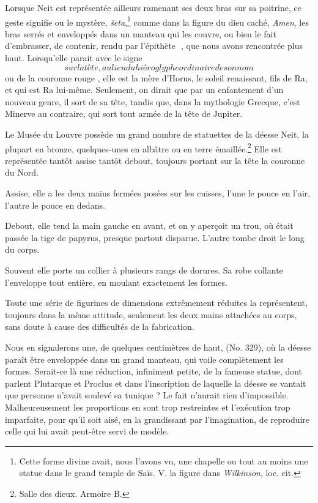 \documentclass[a4paper, 11pt, oneside]{article}
\newcommand*\hieroAAAH{}
\newcommand*\hieroAAAO{}
\newcommand*\hieroAACI{}
\newcommand*\hieroAAIL{}
\newcommand*\hieroABFY{\raisebox{0.3ex}{}}
\begin{document}
Lorsque Neit est représentée ailleurs ramenant ses deux bras sur sa poitrine, ce geste signifie ou le mystère, \emph{šeta},\footnote{Cette forme divine avait, nous l'avons vu, une chapelle ou tout au moins une statue dans le grand temple de Saïs. V. la figure dans \emph{Wilkinson}, loc. cit.} comme dans la figure du dieu caché, \emph{Amen}, les bras serrés et enveloppés dans un manteau qui les couvre, ou bien le fait d'embrasser, de contenir, rendu par l'épithète $\hieroAAAH\:\hieroABFY$, que nous avons rencontrée plus haut. Lorsqu'elle parait avec le signe $\hieroAACI$ sur la tête, au lieu du hiéroglyphe ordinaire de son nom $\hieroAAAO$ ou de la couronne rouge $\hieroAAIL$, elle est la mère d'Horus, le soleil renaissant, fils de Ra, et qui est Ra lui-même. Seulement, on dirait que par un enfantement d'un nouveau genre, il sort de sa tête, tandis que, dans la mythologie Grecque, c'est Minerve au contraire, qui sort tout armée de la tête de Jupiter.

Le Musée du Louvre possède un grand nombre de statuettes de la déesse Neit, la plupart en bronze, quelques-unes en albâtre ou en terre émaillée.\footnote{Salle des dieux. Armoire B.} Elle est représentée tantôt assise tantôt debout, toujours portant sur la tête la couronne du Nord.

Assise, elle a les deux mains fermées posées sur les cuisses, l'une le pouce en l'air, l'autre le pouce en dedans.

Debout, elle tend la main gauche en avant, et on y aperçoit un trou, où était passée la tige de papyrus, presque partout disparue. L'autre tombe droit le long du corps.

Souvent elle porte un collier à plusieurs rangs de dorures. Sa robe collante l'enveloppe tout entière, en moulant exactement les formes.

Toute une série de figurines de dimensions extrêmement réduites la représentent, toujours dans la même attitude, seulement les deux mains attachées au corps, sans doute à cause des difficultés de la fabrication.

Nous en signalerons une, de quelques centimètres de haut, (No. 329), où la déesse paraît être enveloppée dans un grand manteau, qui voile complètement les formes. Serait-ce là une réduction, infiniment petite, de la fameuse statue, dont parlent Plutarque et Proclus et dans l'inscription de laquelle la déesse se vantait que personne n'avait soulevé sa tunique ? Le fait n'aurait rien d'impossible. Malheureusement les proportions en sont trop restreintes et l'exécution trop imparfaite, pour qu'il soit aisé, en la grandissant par l'imagination, de reproduire celle qui lui avait peut-être servi de modèle.
\end{document}
